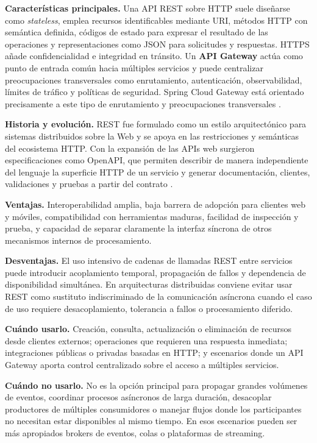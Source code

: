 \documentclass[12pt,a4paper]{article}
\begin{document}
\textbf{Características principales.} Una API REST sobre HTTP suele diseñarse como \textit{stateless}, emplea recursos identificables mediante URI, métodos HTTP con semántica definida, códigos de estado para expresar el resultado de las operaciones y representaciones como JSON para solicitudes y respuestas. HTTPS añade confidencialidad e integridad en tránsito. Un \textbf{API Gateway} actúa como punto de entrada común hacia múltiples servicios y puede centralizar preocupaciones transversales como enrutamiento, autenticación, observabilidad, límites de tráfico y políticas de seguridad. Spring Cloud Gateway está orientado precisamente a este tipo de enrutamiento y preocupaciones transversales \cite{spring-cloud-gateway}.

\textbf{Historia y evolución.} REST fue formulado como un estilo arquitectónico para sistemas distribuidos sobre la Web y se apoya en las restricciones y semánticas del ecosistema HTTP. Con la expansión de las APIs web surgieron especificaciones como OpenAPI, que permiten describir de manera independiente del lenguaje la superficie HTTP de un servicio y generar documentación, clientes, validaciones y pruebas a partir del contrato \cite{openapi-spec}.

\textbf{Ventajas.} Interoperabilidad amplia, baja barrera de adopción para clientes web y móviles, compatibilidad con herramientas maduras, facilidad de inspección y prueba, y capacidad de separar claramente la interfaz síncrona de otros mecanismos internos de procesamiento.

\textbf{Desventajas.} El uso intensivo de cadenas de llamadas REST entre servicios puede introducir acoplamiento temporal, propagación de fallos y dependencia de disponibilidad simultánea. En arquitecturas distribuidas conviene evitar usar REST como sustituto indiscriminado de la comunicación asíncrona cuando el caso de uso requiere desacoplamiento, tolerancia a fallos o procesamiento diferido.

\textbf{Cuándo usarlo.} Creación, consulta, actualización o eliminación de recursos desde clientes externos; operaciones que requieren una respuesta inmediata; integraciones públicas o privadas basadas en HTTP; y escenarios donde un API Gateway aporta control centralizado sobre el acceso a múltiples servicios.

\textbf{Cuándo no usarlo.} No es la opción principal para propagar grandes volúmenes de eventos, coordinar procesos asíncronos de larga duración, desacoplar productores de múltiples consumidores o manejar flujos donde los participantes no necesitan estar disponibles al mismo tiempo. En esos escenarios pueden ser más apropiados brokers de eventos, colas o plataformas de streaming.
\end{document}
